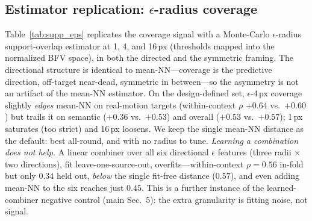 \documentclass[runningheads]{llncs}
\newcommand{\dtb}{d_{T\to B}}
\newcommand{\dbt}{d_{B\to T}}
\newcommand{\enctrained}{\textcolor{orange!90!red}{\faFire}}
\newcommand{\encfrozen}{\textcolor{cyan!55!blue}{\faSnowflake[regular]}}
\begin{document}
\begin{table}[h]
\centering
\caption{Per-configuration ranking correlations behind the coverage law: the
regime-matched rule vs.\ the two fixed directions ($\dtb$ off-target, $\dbt$
coverage) and three symmetric baselines (mean-NN sym, FID, sliced-$W_2$), all in
BFV motion space. Encoder: \enctrained\ trained, \encfrozen\ frozen. Coverage
($\dbt$) is the consistent positive predictor under a pretrained backbone, where
the two directions disagree most; the symmetric metrics hedge everywhere.}
\label{tab:supp_asym}
\scriptsize
\setlength{\tabcolsep}{3pt}

\end{table}

\subsection{Estimator replication: $\epsilon$-radius coverage}
Table~\ref{tab:supp_eps} replicates the coverage signal with a Monte-Carlo
$\epsilon$-radius support-overlap estimator at 1, 4, and 16\,px (thresholds
mapped into the normalized BFV space), in both the directed and the symmetric
framing. The directional structure is identical to mean-NN---coverage is the
predictive direction, off-target near-dead, symmetric in between---so the
asymmetry is not an artifact of the mean-NN estimator. On the design-defined set,
$\epsilon$-4\,px coverage slightly \emph{edges} mean-NN on real-motion targets
(within-context $\rho$ $+0.64$ vs.\ $+0.60$) but trails it on semantic ($+0.36$
vs.\ $+0.53$) and overall ($+0.53$ vs.\ $+0.57$); 1\,px saturates (too strict) and
16\,px loosens. We keep the single mean-NN distance as the default: best
all-round, and with no radius to tune. \emph{Learning a combination does not
help.} A linear combiner over all six directional $\epsilon$ features (three radii
$\times$ two directions), fit leave-one-source-out, overfits---within-context
$\rho{=}0.56$ in-fold but only $0.34$ held out, \emph{below} the single fit-free
distance ($0.57$), and even adding mean-NN to the six reaches just $0.45$. This is
a further instance of the learned-combiner negative control (main Sec.~5): the
extra granularity is fitting noise, not signal.

\begin{table}[h]
\centering
\caption{$\epsilon$-radius coverage replication of the rule (per variant,
regime-grouped).}
\label{tab:supp_eps}
\scriptsize
\setlength{\tabcolsep}{3pt}

\end{table}
\end{document}
